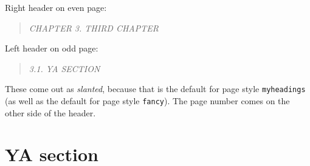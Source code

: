 \documentclass{book}
\begin{document}
Right header on even page:
\begin{quote}
  \textsl{CHAPTER 3. THIRD CHAPTER}
\end{quote}
Left header on odd page:
\begin{quote}
  \textsl{3.1. YA SECTION}
\end{quote}
These come out as \textsl{slanted}, because that is the default for page style \texttt{myheadings} (as well as the default for page style \texttt{fancy}).
The page number comes on the other side of the header.

\lipsum[1]

\section{YA section}

\lipsum
\end{document}
